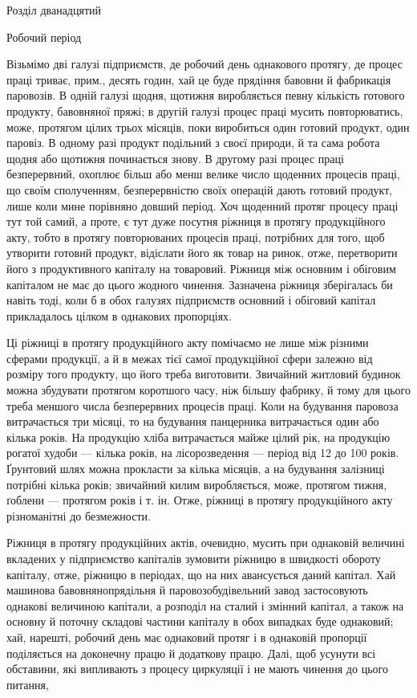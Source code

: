 Розділ дванадцятий

Робочий період

Візьмімо дві галузі підприємств, де робочий день однакового протягу,
де процес праці триває, прим., десять годин, хай це буде прядіння
бавовни й фабрикація паровозів. В одній галузі щодня, щотижня виробляється
певну кількість готового продукту, бавовняної пряжі; в другій
галузі процес праці мусить повторюватись, може, протягом цілих трьох
місяців, поки виробиться один готовий продукт, один паровіз. В одному
разі продукт подільний з своєї природи, й та сама робота щодня або
щотижня починається знову. В другому разі процес праці безперервний,
охоплює більш або менш велике число щоденних процесів праці, що своїм
сполученням, безперервністю своїх операцій дають готовий продукт, лише
коли мине порівняно довший період. Хоч щоденний протяг процесу праці
тут той самий, а проте, є тут дуже посутня ріжниця в протягу продукційного
акту, тобто в протягу повторюваних процесів праці, потрібних
для того, щоб утворити готовий продукт, відіслати його як товар на
ринок, отже, перетворити його з продуктивного капіталу на товаровий.
Ріжниця між основним і обіговим капіталом не має до цього жодного
чинення. Зазначена ріжниця зберігалась би навіть тоді, коли б в обох
галузях підприємств основний і обіговий капітал прикладалось цілком
в однакових пропорціях.

Ці ріжниці в протягу продукційного акту помічаємо не лише між
різними сферами продукції, а й в межах тієї самої продукційної сфери
залежно від розміру того продукту, що його треба виготовити. Звичайний
житловий будинок можна збудувати протягом коротшого часу,
ніж більшу фабрику, й тому для цього треба меншого числа безперервних
процесів праці. Коли на будування паровоза витрачається три місяці,
то на будування панцерника витрачається один або кілька років. На продукцію
хліба витрачається майже цілий рік, на продукцію рогатої худоби
— кілька років, на лісорозведення — період від 12 до 100 років. Ґрунтовий
шлях можна прокласти за кілька місяців, а на будування залізниці
потрібні кілька років; звичайний килим виробляється, може, протягом
тижня, ґоблени — протягом років і т. ін. Отже, ріжниці в протягу продукційного
акту різноманітні до безмежности.

Ріжниця в протягу продукційних актів, очевидно, мусить при однаковій
величині вкладених у підприємство капіталів зумовити ріжницю в
швидкості обороту капіталу, отже, ріжницю в періодах, що на них авансується
даний капітал. Хай машинова бавовнянопрядільня й паровозобудівельний
завод застосовують однакові величиною капітали, а розподіл
на сталий і змінний капітал, а також на основну й поточну складові частини
капіталу в обох випадках буде однаковий; хай, нарешті, робочий
день має однаковий протяг і в однаковій пропорції поділяється на доконечну
працю й додаткову працю. Далі, щоб усунути всі обставини, які
випливають з процесу циркуляції і не мають чинення до цього питання,
\parbreak{}  %

